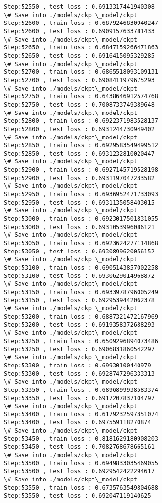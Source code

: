 \documentclass[11pt]{article}
\begin{document}
\begin{Verbatim}[commandchars=\\\{\}]
Step:52550 , test loss : 0.6913317441940308
\# Save into ./models/ckpt\_model/ckpt
Step:52600 , train loss : 0.6879246830940247
Step:52600 , test loss : 0.6909157633781433
\# Save into ./models/ckpt\_model/ckpt
Step:52650 , train loss : 0.6847159266471863
Step:52650 , test loss : 0.6916415095329285
\# Save into ./models/ckpt\_model/ckpt
Step:52700 , train loss : 0.6865518093109131
Step:52700 , test loss : 0.6908411979675293
\# Save into ./models/ckpt\_model/ckpt
Step:52750 , train loss : 0.6438646912574768
Step:52750 , test loss : 0.7008733749389648
\# Save into ./models/ckpt\_model/ckpt
Step:52800 , train loss : 0.6922371983528137
Step:52800 , test loss : 0.6931244730949402
\# Save into ./models/ckpt\_model/ckpt
Step:52850 , train loss : 0.6929583549499512
Step:52850 , test loss : 0.6931232810020447
\# Save into ./models/ckpt\_model/ckpt
Step:52900 , train loss : 0.6927145719528198
Step:52900 , test loss : 0.6931197047233582
\# Save into ./models/ckpt\_model/ckpt
Step:52950 , train loss : 0.6936952471733093
Step:52950 , test loss : 0.6931135058403015
\# Save into ./models/ckpt\_model/ckpt
Step:53000 , train loss : 0.6923017501831055
Step:53000 , test loss : 0.6931053996086121
\# Save into ./models/ckpt\_model/ckpt
Step:53050 , train loss : 0.6923624277114868
Step:53050 , test loss : 0.6930899620056152
\# Save into ./models/ckpt\_model/ckpt
Step:53100 , train loss : 0.6905143857002258
Step:53100 , test loss : 0.6930629014968872
\# Save into ./models/ckpt\_model/ckpt
Step:53150 , train loss : 0.6933978796005249
Step:53150 , test loss : 0.6929539442062378
\# Save into ./models/ckpt\_model/ckpt
Step:53200 , train loss : 0.6887321472167969
Step:53200 , test loss : 0.6919358372688293
\# Save into ./models/ckpt\_model/ckpt
Step:53250 , train loss : 0.6509296894073486
Step:53250 , test loss : 0.6906831860542297
\# Save into ./models/ckpt\_model/ckpt
Step:53300 , train loss : 0.69930100440979
Step:53300 , test loss : 0.6928747296333313
\# Save into ./models/ckpt\_model/ckpt
Step:53350 , train loss : 0.6896899938583374
Step:53350 , test loss : 0.6917207837104797
\# Save into ./models/ckpt\_model/ckpt
Step:53400 , train loss : 0.6179232597351074
Step:53400 , test loss : 0.697559118270874
\# Save into ./models/ckpt\_model/ckpt
Step:53450 , train loss : 0.8181629180908203
Step:53450 , test loss : 0.7082768678665161
\# Save into ./models/ckpt\_model/ckpt
Step:53500 , train loss : 0.6949833035469055
Step:53500 , test loss : 0.6929542422294617
\# Save into ./models/ckpt\_model/ckpt
Step:53550 , train loss : 0.6735763549804688
Step:53550 , test loss : 0.692047119140625

\end{Verbatim}
\end{document}
